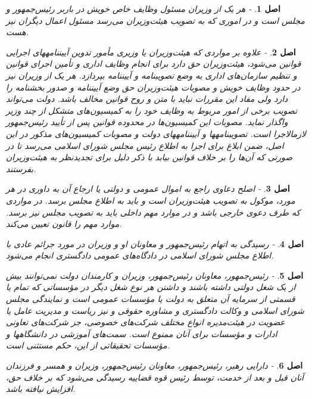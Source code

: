 \documentclass[12pt]{article}
\newtheorem{asl}{اصل}
\begin{document}
\begin{asl}- 
هر یک از وزیران مسئول وظایف خاص خویش در باربر رئیس‌جمهور و مجلس است و در اموری که به تصویب هیئت‌وزیران می‌رسد مسئول اعمال دیگران نیز هست.  
\end{asl}

\begin{asl}- 
علاوه بر مواردی که هیئت‌وزیران یا وزیری مأمور تدوین آیین‏نامه‏های اجرایی قوانین می‌شود، هیئت‌وزیران حق دارد برای انجام وظایف اداری و تأمین اجرای قوانین و تنظیم سازمان‌های اداری به وضع تصویب‏نامه و آیین‏نامه بپردازد. هر یک از وزیران نیز در حدود وظایف خویش و مصوبات هیئت‌وزیران حق وضع آیین‏نامه و صدور بخشنامه را دارد ولی مفاد این مقررات نباید با متن و روح قوانین مخالف باشد. 
دولت می‌تواند تصویب برخی از امور مربوط به وظایف خود را به کمیسیون‌های متشکل از چند وزیر واگذار نماید. مصوبات این کمیسیون‌ها در محدوده قوانین پس از تأیید رئیس‌جمهور لازم‏الاجرا است. 
تصویب‏نامه‏ها و آیین‏نامه‏های دولت و مصوبات کمیسیون‌های مذکور در این اصل‏، ضمن ابلاغ برای اجرا به اطلاع رئیس مجلس شورای اسلامی می‌رسد تا در صورتی که آن‌ها را بر خلاف قوانین بیابد با ذکر دلیل برای تجدیدنظر به هیئت‌وزیران بفرستند. 
\end{asl}

\begin{asl}- 
اصلح دعاوی راجع به اموال عمومی و دولتی یا ارجاع آن به داوری در هر مورد، موکول به تصویب هیئت‌وزیران است و باید به اطلاع مجلس برسد. در مواردی که طرف دعوی خارجی باشد و در موارد مهم داخلی باید به تصویب مجلس نیز برسد. موارد مهم را قانون تعیین می‌کند. 
\end{asl}

\begin{asl}- 
رسیدگی به اتهام رئیس‌جمهور و معاونان او و وزیران در مورد جرائم عادی با اطلاع مجلس شورای اسلامی در دادگاه‌های عمومی دادگستری انجام می‌شود. 
\end{asl}

\begin{asl}- 
رئیس‌جمهور، معاونان رئیس‌جمهور، وزیران و کارمندان دولت نمی‌توانند بیش از یک شغل دولتی داشته باشند و داشتن هر نوع شغل دیگر در مؤسساتی که تمام یا قسمتی از سرمایه آن متعلق به دولت یا مؤسسات عمومی است و نمایندگی مجلس شورای اسلامی و وکالت دادگستری و مشاوره حقوقی و نیز ریاست و مدیریت عامل یا عضویت در هیئت‌مدیره انواع مختلف شرکت‌های خصوصی، جز شرکت‌های تعاونی ادارات و مؤسسات برای آنان ممنوع است. سمت‌های آموزشی در دانشگاه‏ها و مؤسسات تحقیقاتی از این، حکم مستثنی است. 
\end{asl}

\begin{asl}- 
دارایی رهبر، رئیس‌جمهور، معاونان رئیس‌جمهور، وزیران و همسر و فرزندان آنان قبل و بعد از خدمت، توسط رئیس قوه قضاییه رسیدگی می‌شود که بر خلاف حق، افزایش نیافته باشد. 
\end{asl}
\end{document}
